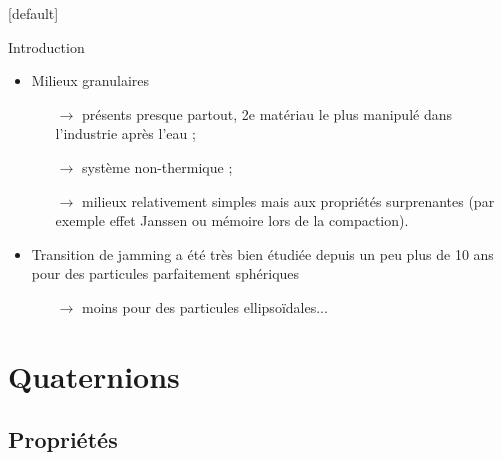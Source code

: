 \documentclass{beamer}
\begin{document}
{
\makeatletter %
    [default] %
    \def\beamer@entrycode{\vspace*{-\headheight}}
\begin{frame}{Introduction}

\begin{itemize}
\item Milieux granulaires
    \begin{itemize}
    \item[$\rightarrow$] présents presque partout, 2e matériau le plus manipulé dans l’industrie après l’eau ;
    \item[$\rightarrow$] système non-thermique ;
	\item[$\rightarrow$] milieux relativement simples mais aux propriétés surprenantes (par exemple effet Janssen ou mémoire lors de la compaction).
    \end{itemize}
    \vspace{10pt}
\item Transition de jamming a été très bien étudiée depuis un peu plus de 10 ans pour des particules parfaitement sphériques
    \begin{itemize}
        \item[$\rightarrow$] moins pour des particules ellipsoïdales...
    \end{itemize}
\end{itemize}

\end{frame}
}

\section{Quaternions}

\subsection{Propriétés}
\end{document}
